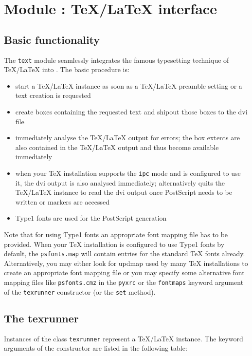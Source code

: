 \chapter{Module : \TeX/\LaTeX{} interface}
\label{module:text}

\section{Basic functionality}

The \verb|text| module seamlessly integrates the famous typesetting
technique of \TeX/\LaTeX{} into \PyX. The basic procedure is:
\begin{itemize}
\item start a \TeX/\LaTeX{} instance as soon as a \TeX/\LaTeX{}
preamble setting or a text creation is requested
\item create boxes containing the requested text and shipout those
boxes to the dvi file
\item immediately analyse the \TeX/\LaTeX{} output for errors; the box
extents are also contained in the \TeX/\LaTeX{} output and thus become
available immediately
\item when your TeX installation supports the \verb|ipc| mode and
\PyX{} is configured to use it, the dvi output is also analysed
immediately; alternatively \PyX{} quits the \TeX/\LaTeX{} instance to
read the dvi output once PostScript needs to be written or markers are
accessed
\item Type1 fonts are used for the PostScript generation
\end{itemize}

Note that for using Type1 fonts an appropriate font mapping file has
to be provided. When your \TeX{} installation is configured to use
Type1 fonts by default, the \verb|psfonts.map| will contain entries
for the standard \TeX{} fonts already. Alternatively, you may either
look for updmap used by many \TeX{} installations to create an
appropriate font mapping file or you may specify some alternative
font mapping files like \verb|psfonts.cmz| in the \verb|pyxrc| or the
\verb|fontmaps| keyword argument of the \verb|texrunner| constructor
(or the \verb|set| method).

\section{The texrunner}
Instances of the class \verb|texrunner| represent a \TeX/\LaTeX{}
instance. The keyword arguments of the constructor are listed in the
following table:

